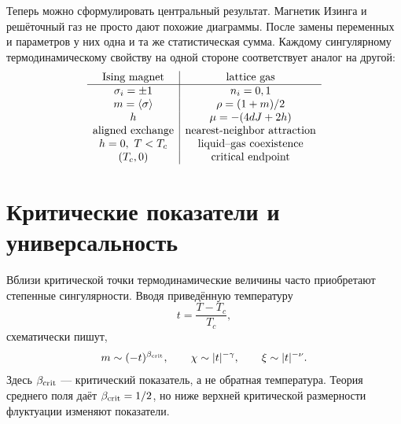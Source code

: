\begin{classroomqa}
\end{classroomqa}

Теперь можно сформулировать центральный результат. Магнетик Изинга и решёточный газ не просто дают похожие диаграммы. После замены переменных и параметров у них одна и та же статистическая сумма. Каждому сингулярному термодинамическому свойству на одной стороне соответствует аналог на другой:
\begin{equation}
\begin{array}{c|c}
\text{Ising magnet} & \text{lattice gas}\\ \hline
\sigma_i=\pm1 & n_i=0,1\\
m=\left\langle\sigma\right\rangle & \rho=(1+m)/2\\
h & \mu=-(4dJ+2h)\\
\text{aligned exchange} & \text{nearest-neighbor attraction}\\
h=0,\ T<T_c & \text{liquid--gas coexistence}\\
(T_c,0) & \text{critical endpoint}
\end{array}
\label{eq:ising-fluid-dictionary}
\end{equation}

\section{Критические показатели и универсальность}

Вблизи критической точки термодинамические величины часто приобретают степенные сингулярности. Вводя приведённую температуру
\begin{equation}
t=\frac{T-T_c}{T_c},
\end{equation}
схематически пишут,
\begin{equation}
m\sim(-t)^{\beta_{\rm crit}},
\qquad
\chi\sim |t|^{-\gamma},
\qquad
\xi\sim |t|^{-\nu}.
\label{eq:critical-exponents}
\end{equation}
Здесь \(\beta_{\rm crit}\) — критический показатель, а не обратная температура. Теория среднего поля даёт \(\beta_{\rm crit}=1/2\), но ниже верхней критической размерности флуктуации изменяют показатели.

